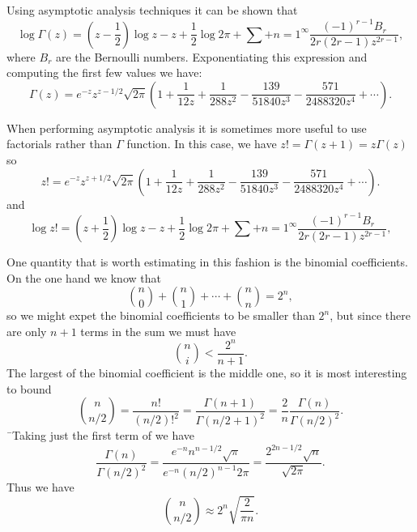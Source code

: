 Using asymptotic analysis techniques it can be shown that
\begin{equation} \label{LogGammaStirling:Eq}
\log \Gamma(z) =
\left(z - \frac{1}{2}\right) \log z - z + \frac{1}{2}\log 2\pi
+ \sum+{n=1}^{\infty} \frac{(-1)^{r-1} B_r}{2r(2r-1) z^{2r-1}},
\end{equation}
where $B_r$ are the Bernoulli numbers.  Exponentiating this expression
and computing the first few values we have:
\begin{equation} \label{GammaStirling:Eq}
\Gamma(z) =
e^{-z} z^{z-1/2} \sqrt{2\pi} \left(1 + \frac{1}{12 z} + \frac{1}{288
z^2}
- \frac{139}{51840 z^3} - \frac{571}{2488320 z^4} + \cdots \right).
\end{equation}

When performing asymptotic analysis it is sometimes more useful to use
factorials rather than $\Gamma$ function.  In this case, we have $z! =
\Gamma(z+1) = z \Gamma(z)$ so
\begin{equation} \label{FactStirling:Eq}
z!
   = e^{-z} z^{z+1/2} \sqrt{2\pi} \left(1 + \frac{1}{12 z} + \frac{1}{288
z^2}
- \frac{139}{51840 z^3} - \frac{571}{2488320 z^4} + \cdots \right).
\end{equation}
and 
\begin{equation} \label{logFactStirling:Eq}
\log z! =
\left(z + \frac{1}{2}\right) \log z - z + \frac{1}{2}\log 2\pi
+ \sum+{n=1}^{\infty} \frac{(-1)^{r-1} B_r}{2r(2r-1) z^{2r-1}},
\end{equation}

\medskip
One quantity that is worth estimating in this fashion is the binomial
coefficients.  On the one hand we know that 
\[
\binom{n}{0} + \binom{n}{1} + \cdots + \binom{n}{n} = 2^n,
\]
so we might expet the binomial coefficients to be smaller than $2^n$,
but since there are only $n+1$ terms in the sum we must have
\[
\binom{n}{i} < \frac{2^n}{n+1}.
\]
The largest of the binomial coefficient is the middle one, so it is
most interesting to bound 
\[
\binom{n}{n/2} = \frac{n!}{(n/2)!^2} =
\frac{\Gamma(n+1)}{\Gamma(n/2+1)^2} = \frac{2}{n}
\frac{\Gamma(n)}{\Gamma(n/2)^2}.
\]
¯Taking just the first term of  we have
\[
\frac{\Gamma(n)}{\Gamma(n/2)^2} = 
\frac{e^{-n} n^{n-1/2} \sqrt{\pi}}{e^{-n} (n/2)^{n-1} 2\pi} =
\frac{2^{2n-1/2} \sqrt{n}}{\sqrt{2\pi}}.
\]
Thus we have
\begin{equation} \label{BinomialStirling:Eq}
\binom{n}{n/2} \approx 2^n \sqrt{\frac{2}{\pi n}}.
\end{equation}

